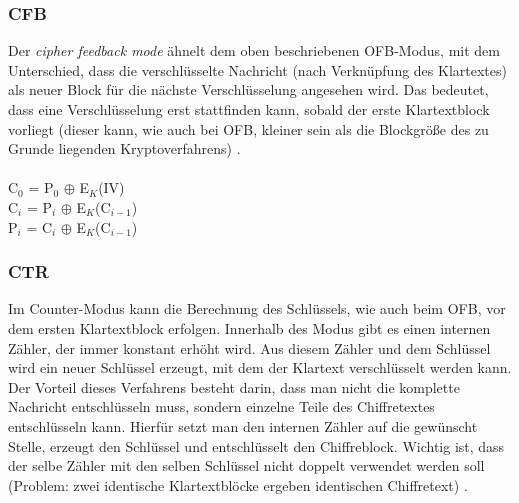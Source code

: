 \documentclass[10pt, a4paper,headsepline,pointednumbers]{scrreprt}
\begin{document}
\subsubsection{CFB}
Der \textit{cipher feedback mode} ähnelt dem oben beschriebenen OFB-Modus, mit dem Unterschied, dass die verschlüsselte Nachricht (nach Verknüpfung des Klartextes) als neuer Block für die nächste Verschlüsselung angesehen wird. Das bedeutet, dass eine Verschlüsselung erst stattfinden kann, sobald der erste Klartextblock vorliegt (dieser kann, wie auch bei OFB, kleiner sein als die Blockgröße des zu Grunde liegenden Kryptoverfahrens)  \citep[S. 235ff]{book:angewandte-krypto}. \\ \\
C$_{0}$ = P$_{0}$ $\oplus$ E$_{K}$(IV) \\
C$_{i}$ = P$_{i}$ $\oplus$ E$_{K}$(C$_{i-1}$) \\
P$_{i}$ = C$_{i}$ $\oplus$ E$_{K}$(C$_{i-1}$) \\

\subsubsection{CTR}
Im Counter-Modus kann die Berechnung des Schlüssels, wie auch beim OFB, vor dem ersten Klartextblock erfolgen. Innerhalb des Modus gibt es einen internen Zähler, der immer konstant erhöht wird. Aus diesem Zähler und dem Schlüssel wird ein neuer Schlüssel erzeugt, mit dem der Klartext verschlüsselt werden kann. Der Vorteil dieses Verfahrens besteht darin, dass man nicht die komplette Nachricht entschlüsseln muss, sondern einzelne Teile des Chiffretextes entschlüsseln kann. Hierfür setzt man den internen Zähler auf die gewünscht Stelle, erzeugt den Schlüssel und entschlüsselt den Chiffreblock. Wichtig ist, dass der selbe Zähler mit den selben Schlüssel nicht doppelt verwendet werden soll (Problem: zwei identische Klartextblöcke ergeben identischen Chiffretext) \citep[S. 243]{book:angewandte-krypto}.
\end{document}
